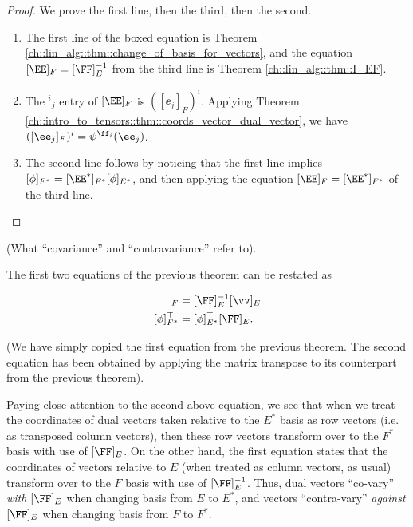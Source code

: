 \begin{proof}
    We prove the first line, then the third, then the second.

    \begin{enumerate}
        \item The first line of the boxed equation is Theorem \ref{ch::lin_alg::thm::change_of_basis_for_vectors}, and the equation $[\EE]_F = [\FF]_E^{-1}$ from the third line is Theorem \ref{ch::lin_alg::thm::I_EF}.
        \item The $^i{}_j$ entry of $[\EE]_F$ is $([\ee_j]_F)^i$. Applying Theorem \ref{ch::intro_to_tensors::thm::coords_vector_dual_vector}, we have $([\ee_j]_F)^i = \psi^{\ff_i}(\ee_j)$. 

        \item The second line follows by noticing that the first line implies $[\phi]_{F^*} = [\EE^*]_{F^*} [\phi]_{E^*}$, and then applying the equation $[\EE]_F = [\EE^*]_{F^*}$ of the third line.
    \end{enumerate}
\end{proof}

\begin{remark}
\label{ch::intro_to_tensors::rmk::covar_contarvar_real_meaning}

    (What ``covariance'' and ``contravariance'' refer to).

    The first two equations of the previous theorem can be restated as
    
    \begin{align*}
        [\vv]_F &= [\FF]_E^{-1} [\vv]_E \\
        [\phi]_{F^*}^\top &= [\phi]_{E^*}^\top [\FF]_E.
    \end{align*}
    
    (We have simply copied the first equation from the previous theorem. The second equation has been obtained by applying the matrix transpose to its counterpart from the previous theorem).
    
    Paying close attention to the second above equation, we see that when we treat the coordinates of dual vectors taken relative to the $E^*$ basis as row vectors (i.e. as transposed column vectors), then these row vectors transform over to the $F^*$ basis with use of $[\FF]_E$. On the other hand, the first equation states that the coordinates of vectors relative to $E$ (when treated as column vectors, as usual) transform over to the $F$ basis with use of $[\FF]_E^{-1}$. Thus, dual vectors ``co-vary'' \textit{with} $[\FF]_E$ when changing basis from $E$ to $E^*$, and vectors ``contra-vary'' \textit{against} $[\FF]_E$ when changing basis from $F$ to $F^*$.
\end{remark}

